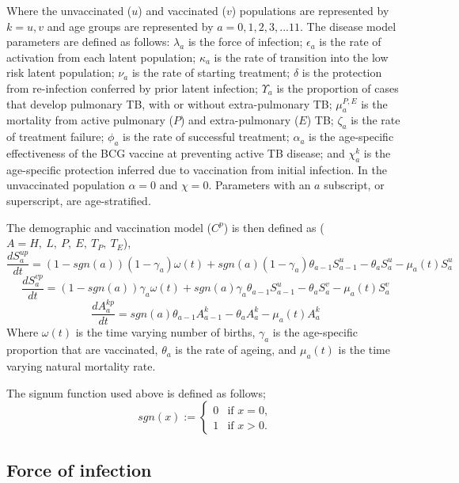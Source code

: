 \documentclass[11pt,twoside]{bristolthesis}
\begin{document}
  Where the unvaccinated (\(u\)) and vaccinated (\(v\)) populations are represented by \(k = u,v\) and age groups are represented by \(a=0,1,2,3, ... 11\). The disease model parameters are defined as follows: \(\lambda_a\) is the force of infection; \(\epsilon_a\) is the rate of activation from each latent population; \(\kappa_a\) is the rate of transition into the low risk latent population; \(\nu_a\) is the rate of starting treatment; \(\delta\) is the protection from re-infection conferred by prior latent infection; \(\Upsilon_a\) is the proportion of cases that develop pulmonary TB, with or without extra-pulmonary TB; \(\mu^{P,E}_a\) is the mortality from active pulmonary (\(P\)) and extra-pulmonary (\(E\)) TB; \(\zeta_a\) is the rate of treatment failure; \(\phi_a\) is the rate of successful treatment; \(\alpha_a\) is the age-specific effectiveness of the BCG vaccine at preventing active TB disease; and \(\chi^k_a\) is the age-specific protection inferred due to vaccination from initial infection. In the unvaccinated population \(\alpha = 0\) and \(\chi = 0\). Parameters with an \(a\) subscript, or superscript, are age-stratified.
  
  The demographic and vaccination model (\(C^p\)) is then defined as (\(A = H,\ L,\ P,\ E,\ T_P,\ T_E\)),
  \begin{equation}
  \frac{dS^{up}_{a}}{dt} = (1 - sgn(a)) (1 - \gamma_a)\omega(t) + sgn(a) (1 - \gamma_a)\theta_{a - 1} S^u_{a - 1} - \theta_a S^u_a -\mu_{a}(t) S^u_a
    \label{eq:sus-age-u-model}
  \end{equation}
  \begin{equation}
  \frac{dS^{vp}_{a}}{dt} = (1 - sgn(a)) \gamma_a\omega(t) + sgn(a)\gamma_a\theta_{a - 1} S^u_{a - 1} - \theta_a S^v_a -\mu_{a}(t) S^v_a
    \label{eq:sus-age-v-model}
  \end{equation}
  \begin{equation}
  \frac{dA^{kp}_{a}}{dt} = sgn(a)\theta_{a - 1} A^k_{a - 1} - \theta_a A^k_{a} - \mu_{a}(t) A^k_{a}
    \label{eq:other-age-model}
  \end{equation}
  Where \(\omega(t)\) is the time varying number of births, \(\gamma_a\) is the age-specific proportion that are vaccinated, \(\theta_a\) is the rate of ageing, and \(\mu_a(t)\) is the time varying natural mortality rate.
  
  The signum function used above is defined as follows;
  \begin{equation}
  sgn(x) := \begin{cases}
  0 & \text{if } x = 0, \\
  1 & \text{if } x > 0. \end{cases}
    \label{eq:signum}
  \end{equation}
  \hypertarget{force-of-infection}{%
  \subsection{Force of infection}\label{force-of-infection}}
  
\end{document}
